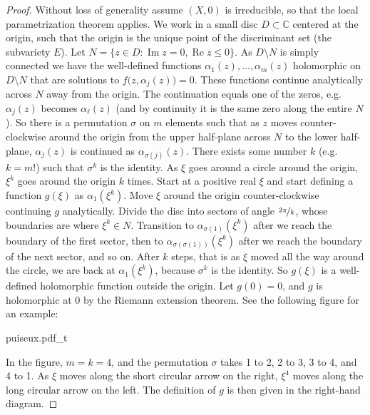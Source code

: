 \documentclass[12pt,openany]{book}
\renewcommand{\Re}{\operatorname{Re}}
\renewcommand{\Im}{\operatorname{Im}}
\newcommand{\C}{{\mathbb{C}}}
\theoremstyle{plain}
\theoremstyle{remark}
\theoremstyle{definition}
\newenvironment{myfig}{%
    \begin{center}
}{%
    \end{center}
}
\theoremstyle{exercise}
\theoremstyle{example}
\begin{document}
\begin{proof}
Without loss of generality
assume $(X,0)$
is irreducible, so that
the local parametrization theorem applies.
We work in a small disc $D \subset \C$ centered at the origin, such that the
origin is the unique point of the discriminant set (the subvariety
$E$).  Let $N = \{ z \in D : \Im z = 0 , \Re z \leq 0 \}$.
As $D \setminus N$ is simply connected we have the well-defined functions
$\alpha_1(z),\ldots,\alpha_m(z)$ holomorphic on $D \setminus N$
that are solutions to $f\bigl(z,\alpha_j(z)\bigr) = 0$.
These functions continue analytically across $N$ away from the
origin.  The continuation equals one of the zeros, e.g.\ $\alpha_j(z)$
becomes $\alpha_\ell(z)$ (and by continuity it is the
same zero along the entire $N$).  So there is
a permutation $\sigma$ on $m$ elements such that as $z$ moves
counter-clockwise around the origin from the upper half-plane across $N$ to the
lower half-plane,
$\alpha_j(z)$ is continued as $\alpha_{\sigma(j)}(z)$.
There exists some number $k$ (e.g.\ $k=m!$) such that $\sigma^k$ is the identity.
As $\xi$ goes around
a circle around the origin, $\xi^k$ goes around the origin $k$ times.
Start at a positive real $\xi$ and start defining a
function $g(\xi)$ as
$\alpha_1(\xi^k)$.
Move $\xi$ around the origin counter-clockwise continuing $g$ analytically.
Divide the disc into sectors of angle $\nicefrac{2\pi}{k}$,
whose boundaries are where $\xi^k \in N$.
Transition to $\alpha_{\sigma(1)}(\xi^k)$ after we reach the boundary
of the first sector, then to
$\alpha_{\sigma(\sigma(1))}(\xi^k)$ after we reach the boundary of the next sector, and so on.
After $k$ steps, that is as
$\xi$ moved all the way around the circle,
we are back at $\alpha_1(\xi^k)$,
because
$\sigma^k$ is the identity.
So $g(\xi)$ is a well-defined holomorphic function outside the origin.  Let
$g(0) = 0$, and $g$ is holomorphic at 0 by the Riemann extension theorem.
See the following figure for an example:

\begin{myfig}
{puiseux.pdf_t}
\end{myfig}

In the figure, $m = k = 4$, and the permutation $\sigma$ takes 1 to 2, 2 to 3, 3 to 4,
and 4 to 1.  As $\xi$ moves along the short circular arrow on the right, $\xi^4$
moves along the long circular arrow on the left.  The definition of $g$ is
then given in the right-hand diagram.
\end{proof}
\end{document}
